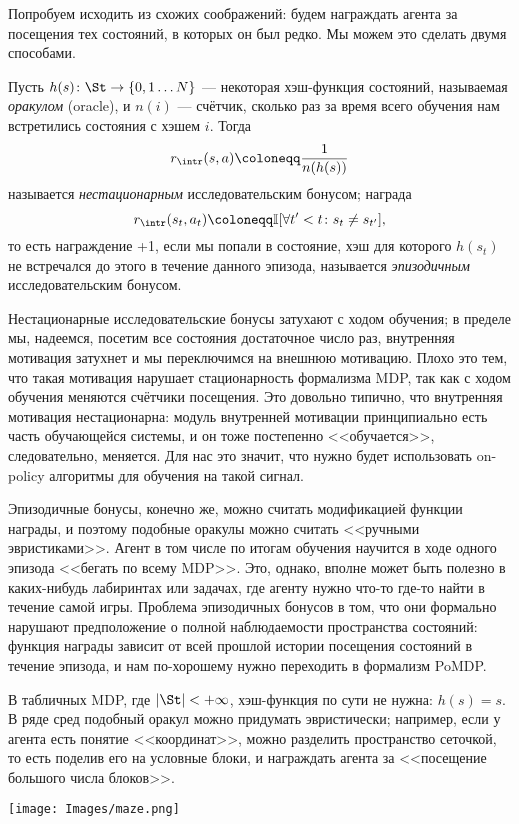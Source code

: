 Попробуем исходить из схожих соображений: будем награждать агента за посещения тех состояний, в которых он был редко. Мы можем это сделать двумя способами.

\begin{definition}
Пусть $h(s) \colon \St \to \{0, 1 \dots N\}$ --- некоторая хэш-функция состояний, называемая \emph{оракулом} (oracle), и $n(i)$ --- счётчик, сколько раз за время всего обучения нам встретились состояния с хэшем $i$. Тогда
$$r_{\intr}(s, a) \coloneqq \frac{1}{n(h(s))}$$
называется \emph{нестационарным} исследовательским бонусом; награда
$$r_{\intr}(s_t, a_t) \coloneqq \mathbb{I}[\forall t' < t \colon s_t \neq s_{t'}],$$
то есть награждение +1, если мы попали в состояние, хэш для которого $h(s_t)$ не встречался до этого в течение данного эпизода, называется \emph{эпизодичным} исследовательским бонусом.
\end{definition}

Нестационарные исследовательские бонусы затухают с ходом обучения; в пределе мы, надеемся, посетим все состояния достаточное число раз, внутренняя мотивация затухнет и мы переключимся на внешнюю мотивацию. Плохо это тем, что такая мотивация нарушает стационарность формализма MDP, так как с ходом обучения меняются счётчики посещения. Это довольно типично, что внутренняя мотивация нестационарна: модуль внутренней мотивации принципиально есть часть обучающейся системы, и он тоже постепенно <<обучается>>, следовательно, меняется. Для нас это значит, что нужно будет использовать on-policy алгоритмы для обучения на такой сигнал.

Эпизодичные бонусы, конечно же, можно считать модификацией функции награды, и поэтому подобные оракулы можно считать <<ручными эвристиками>>. Агент в том числе по итогам обучения научится в ходе одного эпизода <<бегать по всему MDP>>. Это, однако, вполне может быть полезно в каких-нибудь лабиринтах или задачах, где агенту нужно что-то где-то найти в течение самой игры. Проблема эпизодичных бонусов в том, что они формально нарушают предположение о полной наблюдаемости пространства состояний: функция награды зависит от всей прошлой истории посещения состояний в течение эпизода, и нам по-хорошему нужно переходить в формализм PoMDP.

\begin{exampleBox}[righthand ratio=0.25, sidebyside, sidebyside align=center, lower separated=false]{}
В табличных MDP, где $|\St| < +\infty$, хэш-функция по сути не нужна: $h(s) = s$. В ряде сред подобный оракул можно придумать эвристически; например, если у агента есть понятие <<координат>>, можно разделить пространство сеточкой, то есть поделив его на условные блоки, и награждать агента за <<посещение большого числа блоков>>. 

\tcblower
\texttt{[image: Images/maze.png]}
\end{exampleBox}

